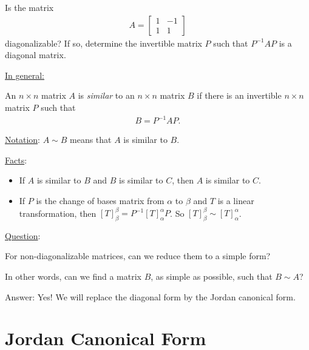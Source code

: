 \documentclass[12pt,a4paper]{article}
\newcounter{example}[section]
\begin{document}
	\newpage
	
	\begin{example}
	Is the matrix
		\begin{align*}
		A = \begin{bmatrix}
		1 & -1 \\ 1 & 1
		\end{bmatrix}
		\end{align*}
	diagonalizable? If so, determine the invertible matrix $P$ such that $P^{-1} A P$ is a diagonal matrix.
	\end{example}
	
	
	\newpage
	
	\underline{In general:}
	
	An $n \times n$ matrix $A$ is \textit{similar} to an $n \times n$ matrix $B$ if there is an invertible $n \times n$ matrix $P$ such that
		\begin{align*}
		B = P^{-1} A P .
		\end{align*}
		
	\underline{Notation}: $A \sim B$ means that $A$ is similar to $B$.
		
	\underline{Facts}:
		\begin{itemize}
		\item If $A$ is similar to $B$ and $B$ is similar to $C$, then $A$ is similar to $C$.
		\item If $P$ is the change of bases matrix from $\alpha$ to $\beta$ and $T$ is a linear transformation, then $[T]_\beta^\beta = P^{-1} [T]_{\alpha}^\alpha P$. So $[T]_{\beta}^\beta \sim [T]_{\alpha}^\alpha$.
		\end{itemize}
		
	\vspace*{24pt}
	
	\underline{Question}:
	
	For non-diagonalizable matrices, can we reduce them to a simple form? 
	
	In other words, can we find a matrix $B$, as simple as possible, such that $B \sim A$? 
	
	Answer: Yes! We will replace the diagonal form by the Jordan canonical form.
	
\newpage

\section{Jordan Canonical Form}
	
\end{document}

